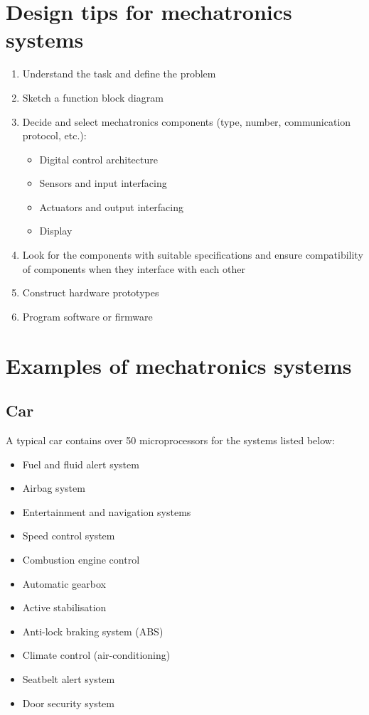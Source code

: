\documentclass[11pt]{article}
\begin{document}
\section{Design tips for mechatronics systems}
\label{sec:org4266bf6}
\begin{enumerate}
\item Understand the task and define the problem
\item Sketch a function block diagram
\item Decide and select mechatronics components (type, number, communication protocol, etc.):
\begin{itemize}
\item Digital control architecture
\item Sensors and input interfacing
\item Actuators and output interfacing
\item Display
\end{itemize}
\item Look for the components with suitable specifications and ensure compatibility of components when they interface with each other
\item Construct hardware prototypes
\item Program software or firmware
\end{enumerate}

\section{Examples of mechatronics systems}
\label{sec:org562963a}

\subsection{Car}
\label{sec:orgf8c5b27}
A typical car contains over 50 microprocessors for the systems listed below:
\begin{itemize}
\item Fuel and fluid alert system
\item Airbag system
\item Entertainment and navigation systems
\item Speed control system
\item Combustion engine control
\item Automatic gearbox
\item Active stabilisation
\item Anti-lock braking system (ABS)
\item Climate control (air-conditioning)
\item Seatbelt alert system
\item Door security system
\end{itemize}
\end{document}
